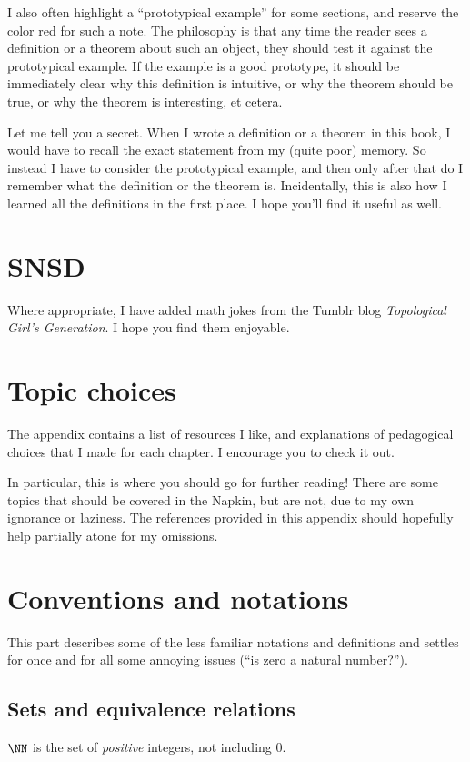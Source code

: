 I also often highlight a ``prototypical example'' for some sections,
and reserve the color red for such a note.
The philosophy is that any time the reader sees a definition
or a theorem about such an object, they should test it
against the prototypical example.
If the example is a good prototype, it should be immediately clear
why this definition is intuitive, or why the theorem should be true,
or why the theorem is interesting, et cetera.

Let me tell you a secret.  When I wrote a definition or a theorem in this book,
I would have to recall the exact statement from my (quite poor) memory. 
So instead I have to consider the prototypical example,
and then only after that do I remember what the definition or the theorem is.
Incidentally, this is also how I learned all the definitions in the first place.
I hope you'll find it useful as well.

\section{SNSD}
Where appropriate, I have added math jokes from the
Tumblr blog \emph{Topological Girl's Generation}.
I hope you find them enjoyable.

\section{Topic choices}
The appendix contains a list of resources I like,
and explanations of pedagogical choices that I made for each chapter.
I encourage you to check it out.

In particular, this is where you should go for further reading!
There are some topics that should be covered in the Napkin,
but are not, due to my own ignorance or laziness.
The references provided in this appendix should hopefully help partially
atone for my omissions.

\section{Conventions and notations}
This part describes some of the less familiar notations and definitions
and settles for once and for all some annoying issues (``is zero a natural number?'').

\subsection*{Sets and equivalence relations}
$\NN$ is the set of \emph{positive} integers, not including $0$.

